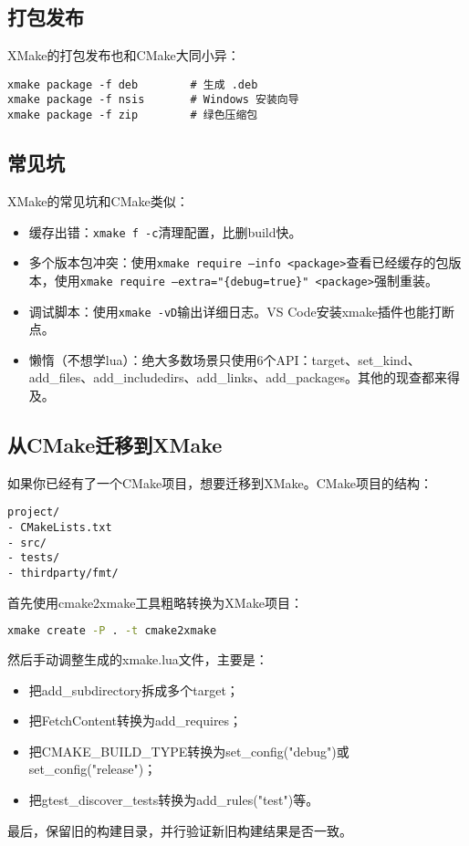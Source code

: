 \documentclass[../main.tex]{subfiles}
\begin{document}
\subsection{打包发布}
XMake的打包发布也和CMake大同小异：
\begin{lstlisting}
xmake package -f deb        # 生成 .deb
xmake package -f nsis       # Windows 安装向导
xmake package -f zip        # 绿色压缩包
\end{lstlisting}

\subsection{常见坑}
XMake的常见坑和CMake类似：
\begin{itemize}
  \item 缓存出错：\texttt{xmake f -c}清理配置，比删build快。
  \item 多个版本包冲突：使用\texttt{xmake require --info <package>}查看已经缓存的包版本，使用\texttt{xmake require --extra="\{debug=true\}" <package>}强制重装。
  \item 调试脚本：使用\texttt{xmake -vD}输出详细日志。VS Code安装xmake插件也能打断点。
  \item 懒惰（不想学lua）：绝大多数场景只使用6个API：target、set\_kind、add\_files、add\_includedirs、add\_links、add\_packages。其他的现查都来得及。
\end{itemize}

\subsection{从CMake迁移到XMake}
如果你已经有了一个CMake项目，想要迁移到XMake。CMake项目的结构：
\begin{lstlisting}
project/
- CMakeLists.txt
- src/
- tests/
- thirdparty/fmt/
\end{lstlisting}

首先使用cmake2xmake工具粗略转换为XMake项目：
\begin{lstlisting}[language=bash]
    xmake create -P . -t cmake2xmake
\end{lstlisting}
然后手动调整生成的xmake.lua文件，主要是：
\begin{itemize}
  \item 把add\_subdirectory拆成多个target；
  \item 把FetchContent转换为add\_requires；
  \item 把CMAKE\_BUILD\_TYPE转换为set\_config("debug")或set\_config("release")；
  \item 把gtest\_discover\_tests转换为add\_rules("test")等。
\end{itemize}
最后，保留旧的构建目录，并行验证新旧构建结果是否一致。
\end{document}

